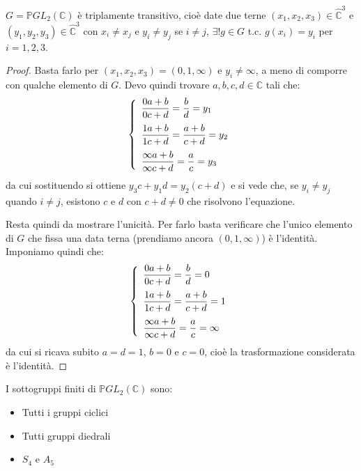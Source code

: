 \begin{lemma}
$G= \mathbb{P}GL_2 (\mathbb{C} )$ è triplamente transitivo, cioè date due terne
$(x_1 , x_2 , x_3 ) \in \hat{\mathbb{C}}^3$ e $(y_1 , y_2 , y_3 ) \in \hat{\mathbb{C}}^3$
con $x_i \neq x_j$ e $y_i \neq y_j$ se $i \neq j$, $\exists ! g \in G$ t.c. $g(x_i )=y_i$ per $i=1,2,3$.
\end{lemma}
\begin{proof}
Basta farlo per $(x_1 , x_2 , x_3 ) = (0,1,\infty )$ e $y_i \neq \infty$, a meno di comporre con qualche elemento di $G$.
Devo quindi trovare $a,b,c,d \in \mathbb{C}$ tali che:
$$
\left\{
\begin{array}{l}
\medskip
\displaystyle{\frac{0a+b}{0c+d}=\frac{b}{d}=y_1} \\
\medskip
\displaystyle{\frac{1a+b}{1c+d}=\frac{a+b}{c+d}=y_2} \\
\displaystyle{\frac{\infty a+b}{\infty c+d}=\frac{a}{c}=y_3}
\end{array}
\right.
$$
da cui sostituendo si ottiene $y_3 c + y_1 d=y_2 (c+d)$ e si vede che, se $y_i \neq y_j$ quando $i \neq j$, esistono $c$ e $d$ con $c+d \neq 0$ che risolvono l'equazione.

Resta quindi da mostrare l'unicità. Per farlo basta verificare che l'unico elemento di $G$ che fissa una data terna
(prendiamo ancora $(0,1,\infty )$) è l'identità. Imponiamo quindi che:
$$
\left\{
\begin{array}{l}
\medskip
\displaystyle{\frac{0a+b}{0c+d}=\frac{b}{d}=0} \\
\medskip
\displaystyle{\frac{1a+b}{1c+d}=\frac{a+b}{c+d}=1} \\
\displaystyle{\frac{\infty a+b}{\infty c+d}=\frac{a}{c}= \infty}
\end{array}
\right.
$$
da cui si ricava subito $a=d=1$, $b=0$ e $c=0$, cioè la trasformazione considerata è l'identità.
\end{proof}

\begin{esercizio}
I sottogruppi finiti di $\mathbb{P}GL_2 (\mathbb{C} )$ sono:
\begin{itemize}
\item Tutti i gruppi ciclici
\item Tutti gruppi diedrali
\item $S_4$ e $A_5$
\end{itemize}
\end{esercizio}


